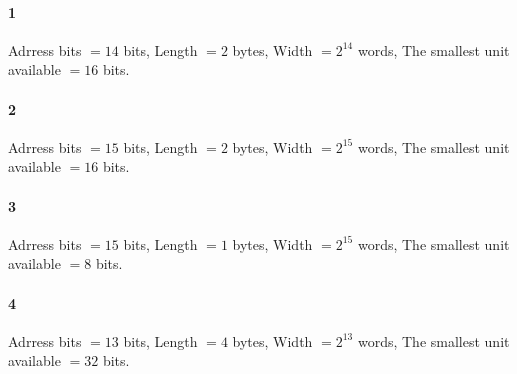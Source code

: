 \documentclass[11pt]{article}
\begin{document}
\paragraph{1}
Adrress bits $= 14$ bits, \qquad Length $= 2$ bytes, \qquad Width $= 2^{14}$ words, \qquad The smallest unit available $= 16$ bits.
\paragraph{2}
Adrress bits $= 15$ bits, \qquad Length $= 2$ bytes, \qquad Width $= 2^{15}$ words, \qquad The smallest unit available $= 16$ bits.
\paragraph{3}
Adrress bits $= 15$ bits, \qquad Length $= 1$ bytes, \qquad Width $= 2^{15}$ words, \qquad The smallest unit available $= 8$ bits.
\paragraph{4}
Adrress bits $= 13$ bits, \qquad Length $= 4$ bytes, \qquad Width $= 2^{13}$ words, \qquad The smallest unit available $= 32$ bits.
\end{document}
